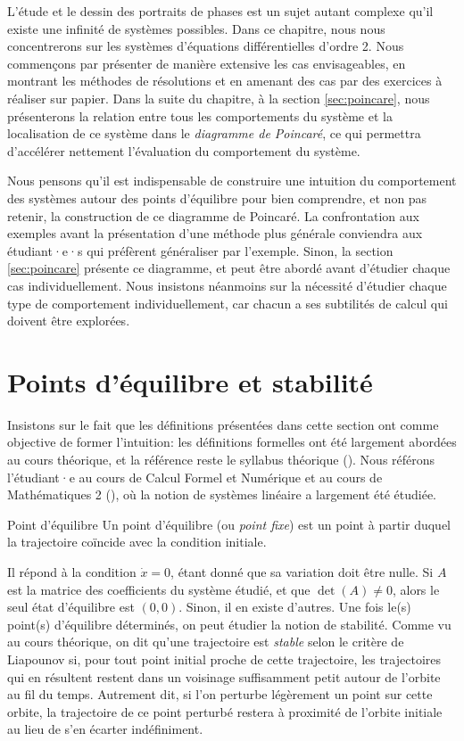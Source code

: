         L'étude et le dessin des portraits de phases est un sujet autant complexe qu'il existe une infinité de systèmes possibles. Dans ce chapitre, nous nous concentrerons sur les systèmes d'équations différentielles d'ordre 2. Nous commençons par présenter de manière extensive les cas envisageables, en montrant les méthodes de résolutions et en amenant des cas par des exercices à réaliser sur papier. Dans la suite du chapitre, à la section \ref{sec:poincare}, nous présenterons la relation entre tous les comportements du système et la localisation de ce système dans le \textit{diagramme de Poincaré}, ce qui permettra d'accélérer nettement l'évaluation du comportement du système. 

        Nous pensons qu'il est indispensable de construire une intuition du comportement des systèmes autour des points d'équilibre pour bien comprendre, et non pas retenir, la construction de ce diagramme de Poincaré. La confrontation aux exemples avant la présentation d'une méthode plus générale conviendra aux étudiant·e·s qui préfèrent généraliser par l'exemple. Sinon, la section \ref{sec:poincare} présente ce diagramme, et peut être abordé avant d'étudier chaque cas individuellement. Nous insistons néanmoins sur la nécessité d'étudier chaque type de comportement individuellement, car chacun a ses subtilités de calcul qui doivent être explorées.
    
    \section{Points d'équilibre et stabilité}
        Insistons sur le fait que les définitions présentées dans cette section ont comme objective de former l'intuition: les définitions formelles ont été largement abordées au cours théorique, et la référence reste le syllabus théorique (\cite{infof305}). Nous référons l'étudiant·e au cours de Calcul Formel et Numérique et au cours de Mathématiques 2 (\cite{infof205}), où la notion de systèmes linéaire a largement été étudiée.
        \begin{definition}{Point d'équilibre}\label{def:point_equilibre}
            Un point d'équilibre (ou \textit{point fixe}) est un point à partir duquel la trajectoire coïncide avec la condition initiale.
        \end{definition}
         Il répond à la condition $\dot{x} = 0$, étant donné que sa variation doit être nulle. Si $A$ est la matrice des coefficients du système étudié, et que $\det(A) \neq 0$, alors le seul état d'équilibre est $(0, 0)$. Sinon, il en existe d'autres.
         Une fois le(s) point(s) d'équilibre déterminés, on peut étudier la notion de stabilité. Comme vu au cours théorique, on dit qu'une trajectoire est \textit{stable} selon le critère de Liapounov si, pour tout point initial proche de cette trajectoire, les trajectoires qui en résultent restent dans un voisinage suffisamment petit autour de l'orbite au fil du temps. Autrement dit, si l'on perturbe légèrement un point sur cette orbite, la trajectoire de ce point perturbé restera à proximité de l'orbite initiale au lieu de s'en écarter indéfiniment. 


